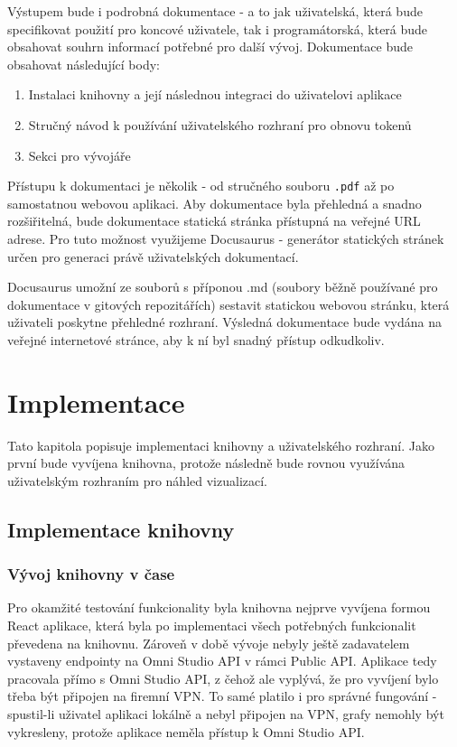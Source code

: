 \documentclass[czech, bc, kiv, he, iso690numb]{fasthesis}
\begin{document}
Výstupem bude i podrobná dokumentace - a to jak uživatelská, která bude specifikovat použití pro koncové uživatele, tak i programátorská, která bude obsahovat souhrn informací potřebné
pro další vývoj. Dokumentace bude obsahovat následující body:

\begin{enumerate}
	\item Instalaci knihovny a její následnou integraci do uživatelovi aplikace
	\item Stručný návod k používání uživatelského rozhraní pro obnovu tokenů
	\item Sekci pro vývojáře
\end{enumerate}

Přístupu k dokumentaci je několik - od stručného souboru \texttt{.pdf} až po samostatnou webovou aplikaci. Aby dokumentace byla přehledná a snadno rozšiřitelná, bude dokumentace statická stránka
přístupná na veřejné URL adrese. Pro tuto možnost využijeme Docusaurus - generátor statických stránek určen pro generaci právě uživatelských dokumentací. 

Docusaurus umožní ze souborů s příponou .md (soubory běžně používané pro dokumentace v gitových repozitářích) sestavit statickou webovou stránku, která uživateli poskytne přehledné 
rozhraní. Výsledná dokumentace bude vydána na veřejné internetové stránce, aby k ní byl snadný přístup odkudkoliv.


\chapter{Implementace}
Tato kapitola popisuje implementaci knihovny a uživatelského rozhraní. Jako první bude vyvíjena knihovna, protože následně bude rovnou využívána uživatelským rozhraním pro
náhled vizualizací.

\section{Implementace knihovny}

\subsection{Vývoj knihovny v čase}

Pro okamžité testování funkcionality byla knihovna nejprve vyvíjena formou React aplikace, která byla po implementaci všech potřebných funkcionalit převedena na knihovnu.
Zároveň v době vývoje nebyly ještě zadavatelem vystaveny endpointy na Omni Studio API v rámci Public API. Aplikace tedy pracovala přímo s Omni Studio API, z čehož ale vyplývá,
že pro vyvíjení bylo třeba být připojen na firemní VPN. To samé platilo i pro správné fungování - spustil-li uživatel aplikaci lokálně a nebyl připojen na VPN, grafy nemohly být vykresleny,
protože aplikace neměla přístup k Omni Studio API. 
\end{document}
